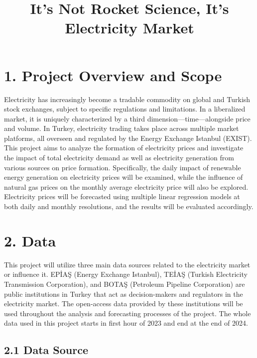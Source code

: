 \documentclass[
  11pt,
  a4paper,
]{article}
\title{\textbf{It's Not Rocket Science, It's Electricity Market}}
\author{}
\date{}
\renewcommand*\contentsname{Table of contents}
\newcommand\contentsname{Table of contents}
\begin{document}
\maketitle

\renewcommand*\contentsname{Table of contents}
{
\hypersetup{linkcolor=}
\setcounter{tocdepth}{3}
\tableofcontents
}

\section{1. Project Overview and
Scope}\label{project-overview-and-scope}

Electricity has increasingly become a tradable commodity on global and
Turkish stock exchanges, subject to specific regulations and
limitations. In a liberalized market, it is uniquely characterized by a
third dimension---time---alongside price and volume. In Turkey,
electricity trading takes place across multiple market platforms, all
overseen and regulated by the Energy Exchange Istanbul (EXIST). This
project aims to analyze the formation of electricity prices and
investigate the impact of total electricity demand as well as
electricity generation from various sources on price formation.
Specifically, the daily impact of renewable energy generation on
electricity prices will be examined, while the influence of natural gas
prices on the monthly average electricity price will also be explored.
Electricity prices will be forecasted using multiple linear regression
models at both daily and monthly resolutions, and the results will be
evaluated accordingly.

\section{2. Data}\label{data}

This project will utilize three main data sources related to the
electricity market or influence it. EPİAŞ (Energy Exchange Istanbul),
TEİAŞ (Turkish Electricity Transmission Corporation), and BOTAŞ
(Petroleum Pipeline Corporation) are public institutions in Turkey that
act as decision-makers and regulators in the electricity market. The
open-access data provided by these institutions will be used throughout
the analysis and forecasting processes of the project. The whole data
used in this project starts in first hour of 2023 and end at the end of
2024.

\subsection{2.1 Data Source}\label{data-source}
\end{document}

